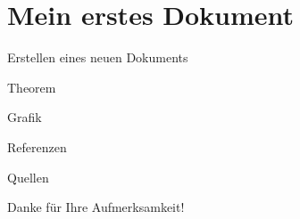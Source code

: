 \documentclass[aspectratio=169,xcolor=dvipsnames,german]{beamer}
\begin{document}
\section{Mein erstes Dokument}

\begin{frame}{Erstellen eines neuen Dokuments}
\end{frame}


\begin{frame}{Theorem}
\end{frame}


\begin{frame}{Grafik}
\end{frame}


\begin{frame}[fragile] %

\end{frame}


\begin{frame}{Referenzen}
\end{frame}


\begin{frame}{Quellen}
    \printbibliography
\end{frame}


\begin{frame}
    \Huge{\centerline{Danke für Ihre Aufmerksamkeit!}}
\end{frame}

\end{document}
